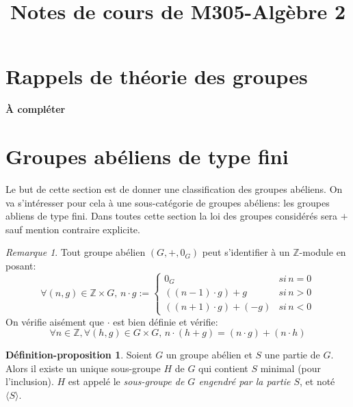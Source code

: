 \documentclass{article}
\newcommand{\Z}{\mathbb{Z}}
\theoremstyle{definition}
\newtheorem{depro}{Définition-proposition}
\theoremstyle{remark}
\newtheorem{rem}{Remarque}
\begin{document}
\title{Notes de cours de M305-Alg\`ebre 2}

\maketitle

\newpage

\tableofcontents

\newpage


\section{Rappels de th\'eorie des groupes}

{\bf\`A compl\'eter}

\section{Groupes abéliens de type fini}

Le but de cette section est de donner une classification des groupes ab\'eliens. On va s'int\'eresser pour cela \`a une sous-cat\'egorie de groupes ab\'eliens: les groupes abliens de type fini. Dans toutes cette section la loi des groupes consid\'er\'es sera $+$ sauf mention contraire explicite.



\begin{rem}
Tout groupe ab\'elien $(G,+,0_G)$ peut s'identifier \`a un $\Z$-module en posant:
$$\forall (n,g)\in\Z\times G,\, n\cdot g:=\begin{cases}0_G & si\, n=0\\ ((n-1)\cdot g)+g & si\, n>0\\((n+1)\cdot g) + (-g) & si\, n<0\end{cases}$$
On v\'erifie ais\'ement que $\cdot$ est bien d\'efinie et v\'erifie:\\
$$\forall n\in \Z,\forall (h,g)\in G\times G,\, n\cdot(h+g)=(n\cdot g)+(n\cdot h)$$
\end{rem}

\begin{depro}
Soient $G$ un groupe abélien et $S$ une partie de $G$. Alors il existe un unique sous-groupe $H$ de $G$ qui contient $S$ minimal (pour l'inclusion). $H$ est appelé le \textit{sous-groupe de $G$ engendré par la partie $S$}, et noté $\langle S\rangle$.
\end{depro}
\end{document}
